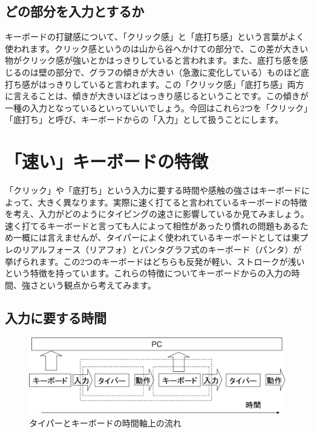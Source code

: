 \subsection{どの部分を入力とするか}
キーボードの打鍵感について、「クリック感」と「底打ち感」という言葉がよく使われます。クリック感というのは山から谷へかけての部分で、この差が大きい物がクリック感が強いとかはっきりしていると言われます。また、底打ち感を感じるのは壁の部分で、グラフの傾きが大きい（急激に変化している）ものほど底打ち感がはっきりしていると言われます。この「クリック感」「底打ち感」両方に言えることは、傾きが大きいほどはっきり感じるということです。この傾きが一種の入力となっているといっていいでしょう。今回はこれら2つを「クリック」「底打ち」と呼び、キーボードからの「入力」として扱うことにします。

\section{「速い」キーボードの特徴}
「クリック」や「底打ち」という入力に要する時間や感触の強さはキーボードによって、大きく異なります。実際に速く打てると言われているキーボードの特徴を考え、入力がどのようにタイピングの速さに影響しているか見てみましょう。
速く打てるキーボードと言っても人によって相性があったり慣れの問題もあるため一概には言えませんが、タイパーによく使われているキーボードとしては東プレのリアルフォース（リアフォ）とパンタグラフ式のキーボード（パンタ）が挙げられます。この2つのキーボードはどちらも反発が軽い、ストロークが浅いという特徴を持っています。これらの特徴についてキーボードからの入力の時間、強さという観点から考えてみます。

\subsection{入力に要する時間}

\begin{figure}
 \begin{center}
   \includegraphics[width=14cm,clip]{res_eigh/img3.eps}
 \end{center}
 \caption{タイパーとキーボードの時間軸上の流れ}
 \label{eigh:img3}
\end{figure}

